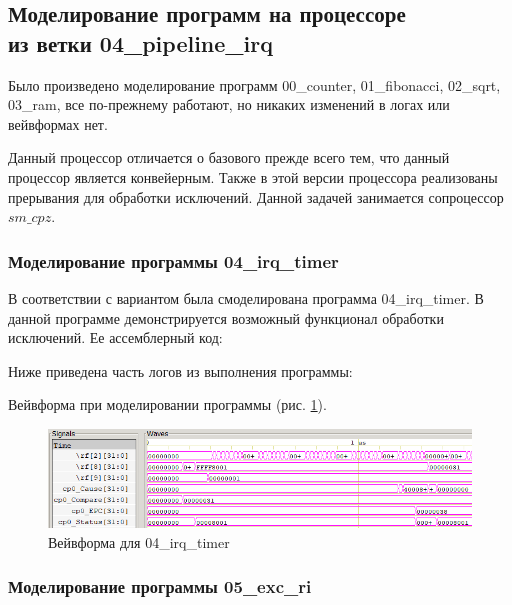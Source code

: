 \documentclass[a4paper,14pt]{article}
\begin{document}
	

	\subsection{Моделирование программ на процессоре \\ из ветки 04\_pipeline\_irq}
	
	Было произведено моделирование программ  00\_counter, 01\_fibonacci, 02\_sqrt, 03\_ram, все по-прежнему работают, но никаких изменений в логах или вейвформах нет.
	
	Данный процессор отличается о базового прежде всего тем, что данный процессор является конвейерным.
	Также в этой версии процессора реализованы прерывания для обработки исключений.
	Данной задачей занимается сопроцессор $sm\_cpz$.
	\subsubsection{Моделирование программы 04\_irq\_timer}
	
	В соответствии с вариантом была смоделирована программа 04\_irq\_timer.
	В данной программе демонстрируется возможный функционал обработки исключений.
	Ее ассемблерный код:
	
	{\small {}}
	
	Ниже приведена часть логов из выполнения программы:
	
	{\small {}}
	
	Вейвформа при моделировании программы (рис. \ref{fig:0404wvf}).
	
	\begin{figure}[H]
		\centering
		\includegraphics[width=0.95\linewidth]{images/04_04_wvf}
		\caption{Вейвформа для  04\_irq\_timer}
		\label{fig:0404wvf}
	\end{figure}

	\subsubsection{Моделирование программы 05\_exc\_ri}
	
\end{document}
